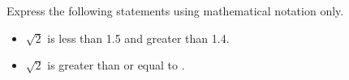 \begin{frame}

Express the following statements using mathematical notation only.

\begin{itemize}
\item $\sqrt{2}$ is less than 1.5 and greater than 1.4.
\item $\sqrt{2}$ is greater than or equal to .
\end{itemize}

\end{frame}

